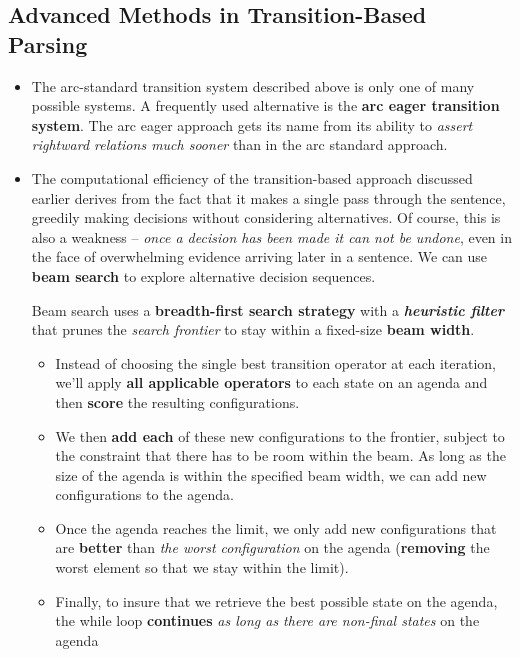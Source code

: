 \documentclass[11pt]{article}
\begin{document}
\subsection{Advanced Methods in Transition-Based Parsing}
\begin{itemize}
\item The arc-standard transition system described above is only one of many possible systems. A frequently used alternative is the \textbf{arc eager transition system}. The arc eager approach gets its name from its ability to \emph{assert rightward relations much sooner} than in the arc standard approach.

\item The computational efficiency of the transition-based approach discussed earlier derives from the fact that it makes a single pass through the sentence, greedily making
decisions without considering alternatives. Of course, this is also a weakness – \emph{once a decision has been made it can not be undone}, even in the face of overwhelming
evidence arriving later in a sentence. We can use \textbf{beam search} to explore alternative decision sequences.

Beam search uses a \textbf{breadth-first search strategy} with a \emph{\textbf{heuristic filter}} that prunes the \emph{search frontier} to stay within a fixed-size \textbf{beam width}. 
\begin{itemize}
\item Instead of choosing the single best transition operator at each iteration, we’ll apply \textbf{all applicable operators} to each state on an agenda and then \textbf{score} the resulting configurations. 

\item We then \textbf{add each} of these new configurations to the frontier, subject to the constraint that there has to be room within the beam. As long as the size of the agenda is within the specified beam width, we can add new configurations to the agenda. 

\item Once the agenda reaches the limit, we only add new configurations that are \textbf{better} than \emph{the worst configuration} on the agenda (\textbf{removing} the worst element so that we stay within the limit). 

\item Finally, to insure that we retrieve the best possible state on the agenda, the while loop \textbf{continues} \emph{as long as there are non-final states} on the agenda
\end{itemize}


\end{itemize}
\end{document}
